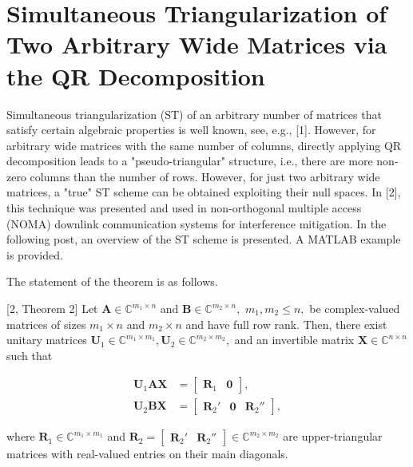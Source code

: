 \section{Simultaneous Triangularization of Two Arbitrary Wide Matrices via the QR Decomposition}

Simultaneous triangularization (ST) of an arbitrary number of matrices that satisfy certain algebraic properties is well known, see, e.g., [1]. However, for arbitrary wide matrices with the same number of columns, directly applying QR decomposition leads to a "pseudo-triangular" structure, i.e., there are more non-zero columns than the number of rows. However, for just two arbitrary wide matrices, a "true" ST scheme can be obtained exploiting their null spaces. In [2], this technique was presented and used in non-orthogonal multiple access (NOMA) downlink communication systems for interference mitigation. In the following post, an overview of the ST scheme is presented. A MATLAB example is provided.

The statement of the theorem is as follows.

[2, Theorem 2] Let $\boldsymbol{A} \in \mathbb{C}^{m_1\times n}$ and $\boldsymbol{B} \in \mathbb{C}^{m_2\times n},$ $m_1,m_2 \leq n,$ be complex-valued matrices of sizes $m_1\times n$ and $m_2\times n$ and have full row rank. Then, there exist unitary matrices $\boldsymbol{U}_1 \in \mathbb{C}^{m_1\times m_1}, \boldsymbol{U}_2 \in \mathbb{C}^{m_2\times m_2},$ and an invertible matrix $\boldsymbol{X} \in \mathbb{C}^{n\times n}$ such that

\begin{align}\boldsymbol{U}_1\boldsymbol{A}\boldsymbol{X} &= \begin{bmatrix}\boldsymbol{R}_1 & \boldsymbol{0}\end{bmatrix}, \label{eqn:std1}\\\boldsymbol{U}_2\boldsymbol{B}\boldsymbol{X} &= \begin{bmatrix}\boldsymbol{R}_2' & \boldsymbol{0} & \boldsymbol{R}_2''\end{bmatrix}, \label{eqn:std2}\end{align}

where $\boldsymbol{R}_1 \in \mathbb{C}^{m_1\times m_1}$ and $\boldsymbol{R}_2 = \begin{bmatrix}\boldsymbol{R}_2'& \boldsymbol{R}_2''\end{bmatrix} \in \mathbb{C}^{m_2\times m_2}$ are upper-triangular matrices with real-valued entries on their main diagonals.

